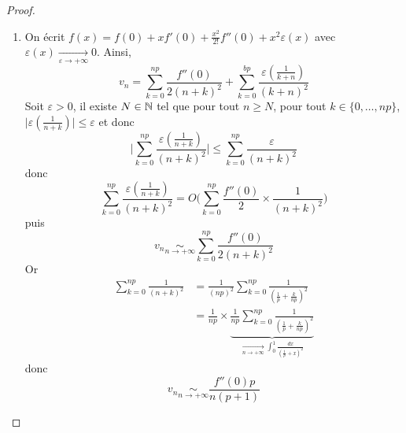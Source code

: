 \begin{proof}
\begin{enumerate}
		\item On écrit $f(x)=f(0)+xf'(0)+\frac{x^{2}}{2!}f''(0)+x^{2}\varepsilon(x)$ avec $\varepsilon(x)\xrightarrow[\varepsilon\to+\infty]{}0$. Ainsi, 
		\begin{equation}v_{n}=\sum_{k=0}^{np}\frac{f''(0)}{2(n+k)^{2}}+\sum_{k=0}^{bp}\frac{\varepsilon(\frac{1}{k+n})}{(k+n)^{2}}\end{equation}
		Soit $\varepsilon>0$, il existe $N\in\mathbb{N}$ tel que pour tout $n\geqslant N$, pour tout $k\in\{0,\dots,np\}$, $\vert\varepsilon(\frac{1}{n+k})\vert\leqslant\varepsilon$ et donc 
		\begin{equation}\Biggl\vert\sum_{k=0}^{np}\frac{\varepsilon(\frac{1}{n+k})}{(n+k)^{2}}\Biggr\vert\leqslant\sum_{k=0}^{np}\frac{\varepsilon}{(n+k)^{2}}\end{equation}
		donc 
		\begin{equation}\sum_{k=0}^{np}\frac{\varepsilon(\frac{1}{n+k})}{(n+k)^{2}}=O\Biggl(\sum_{k=0}^{np}\frac{f''(0)}{2}\times\frac{1}{(n+k)^{2}}\Biggr)\end{equation}
		puis
		\begin{equation}v_{n}\underset{n\to+\infty}{\sim}\sum_{k=0}^{np}\frac{f''(0)}{2(n+k)^{2}}\end{equation}
		Or 
		\begin{align}
			\sum_{k=0}^{np}\frac{1}{(n+k)^{2}}
			&=\frac{1}{(np)^{2}}\sum_{k=0}^{np}\frac{1}{(\frac{1}{p}+\frac{k}{np})^{2}}\\
			&=\frac{1}{np}\times \underbrace{\frac{1}{np}\sum_{k=0}^{np}\frac{1}{(\frac{1}{p}+\frac{k}{np})^{2}}}_{\xrightarrow[n\to+\infty]{}\int_{0}^{1}\frac{dx}{(\frac{1}{p}+x)^{2}}}
		\end{align}
		donc 
		\begin{equation}v_{n}\underset{n\to+\infty}{\sim}\frac{f''(0)p}{n(p+1)}\end{equation}
	\end{enumerate}
\end{proof}

